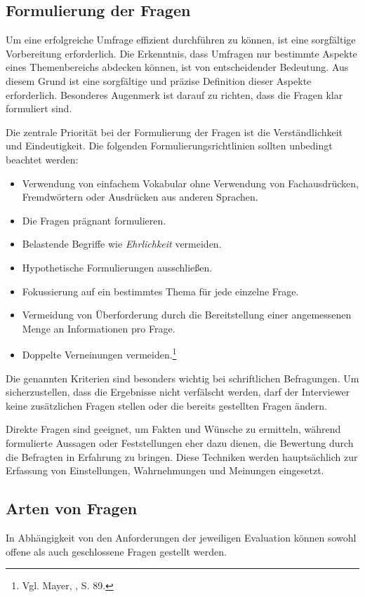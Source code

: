 \subsection{Formulierung der Fragen}
Um eine erfolgreiche Umfrage effizient durchführen zu können, ist eine sorgfältige Vorbereitung erforderlich. Die
Erkenntnis, dass Umfragen nur bestimmte Aspekte eines Themenbereichs abdecken können, ist von entscheidender Bedeutung.
Aus diesem Grund ist eine sorgfältige und präzise Definition dieser Aspekte erforderlich. Besonderes Augenmerk ist darauf
zu richten, dass die Fragen klar formuliert sind.

Die zentrale Priorität bei der Formulierung der Fragen ist die Verständlichkeit und Eindeutigkeit. Die folgenden
Formulierungsrichtlinien sollten unbedingt beachtet werden:
\begin{itemize}
    \item Verwendung von einfachem Vokabular ohne Verwendung von Fachausdrücken, Fremdwörtern oder Ausdrücken aus anderen Sprachen.
    \item Die Fragen prägnant formulieren.
    \item Belastende Begriffe wie \textit{Ehrlichkeit} vermeiden.
    \item Hypothetische Formulierungen ausschließen.
    \item Fokussierung auf ein bestimmtes Thema für jede einzelne Frage.
    \item Vermeidung von Überforderung durch die Bereitstellung einer angemessenen Menge an Informationen pro Frage.
    \item Doppelte Verneinungen vermeiden.\footnote{Vgl. Mayer, \cite{Interview und schriftliche Befragung}, S. 89.}\\
\end{itemize}

Die genannten Kriterien sind besonders wichtig bei schriftlichen Befragungen. Um sicherzustellen, dass die Ergebnisse nicht
verfälscht werden, darf der Interviewer keine zusätzlichen Fragen stellen oder die bereits gestellten Fragen ändern.

Direkte Fragen sind geeignet, um Fakten und Wünsche zu ermitteln, während formulierte Aussagen oder Feststellungen eher
dazu dienen, die Bewertung durch die Befragten in Erfahrung zu bringen. Diese Techniken werden hauptsächlich zur Erfassung
von Einstellungen, Wahrnehmungen und Meinungen eingesetzt.

\subsection{Arten von Fragen}
In Abhängigkeit von den Anforderungen der jeweiligen Evaluation können sowohl offene als auch geschlossene Fragen gestellt werden.

